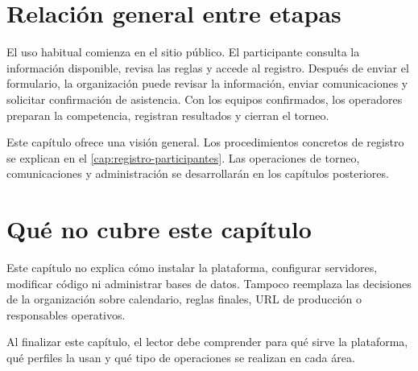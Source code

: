 \section{Relación general entre etapas}

El uso habitual comienza en el sitio público. El participante consulta la información disponible, revisa las reglas y accede al registro. Después de enviar el formulario, la organización puede revisar la información, enviar comunicaciones y solicitar confirmación de asistencia. Con los equipos confirmados, los operadores preparan la competencia, registran resultados y cierran el torneo.

\begin{nota}
Este capítulo ofrece una visión general. Los procedimientos concretos de registro se explican en el \cref{cap:registro-participantes}. Las operaciones de torneo, comunicaciones y administración se desarrollarán en los capítulos posteriores.
\end{nota}

\section{Qué no cubre este capítulo}

Este capítulo no explica cómo instalar la plataforma, configurar servidores, modificar código ni administrar bases de datos. Tampoco reemplaza las decisiones de la organización sobre calendario, reglas finales, URL de producción o responsables operativos.

\begin{resultadoesperado}
Al finalizar este capítulo, el lector debe comprender para qué sirve la plataforma, qué perfiles la usan y qué tipo de operaciones se realizan en cada área.
\end{resultadoesperado}
